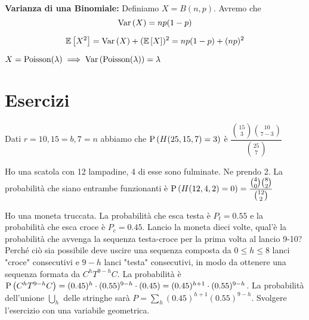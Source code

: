 \begin{defn}
	\textbf{Varianza di una Binomiale:}
	Definiamo $ X = B(n,p)$. Avremo che 
	\begin{equation*}
		\text{Var}\left(X\right) = np(1-p) 
	\end{equation*}
	
	\begin{note}
		\begin{equation*}
			\mathbb{E}\left[X^2\right] = \text{Var}\left(X\right) + (\mathbb{E}\left[X\right])^2 = np(1-p) + (np)^2
		\end{equation*}
	\end{note}
\end{defn}

\begin{defn}
	$ X = \text{Poisson}(\lambda)  \implies  \text{Var}\left(\text{Poisson}(\lambda)\right) = \lambda $
\end{defn}





\section{Esercizi}

\begin{exrc}
	\item Dati $ r = 10, 15 = b, 7 = n $ abbiamo che $ \text{P}\left(H(25,15,7) = 3\right) $ è $ \dfrac{\binom{15}{3}\binom{10}{7-3}}{\binom{25}{7}} $
	
	\item Ho una scatola con 12 lampadine, 4 di esse sono fulminate. Ne prendo 2. La probabilità che siano entrambe funzionanti è $ \text{P}\left(H(12, 4, 2) = 0\right) = \dfrac{\binom{4}{0}\binom{8}{2}}{\binom{12}{2}} $
	
	\item Ho una moneta truccata. La probabilità che esca testa è $ P_t = 0.55 $ e la probabilità che esca croce è $ P_c = 0.45 $. Lancio la moneta dieci volte, qual'è la probabilità che avvenga la sequenza testa-croce per la prima volta al lancio 9-10? Perché ciò sia possibile deve uscire una sequenza composta da $ 0 \leq h \leq 8 $ lanci "croce" consecutivi e $ 9-h $ lanci "testa" consecutivi, in modo da ottenere una sequenza formata da $ C^hT^{9-h}C $. La probabilità è $ \text{P}\left(C^hT^{9-h}C\right) = (0.45)^h \cdot (0.55)^{9-h} \cdot (0.45) = (0.45)^{h+1} \cdot (0.55)^{9-h}$. La probabilità dell'unione $ \bigcup_{h} $ delle stringhe sarà $ P = \sum_{h}(0.45)^{h+1}(0.55)^{9-h}$. Svolgere l'esercizio con una variabile geometrica.
	
\end{exrc}

